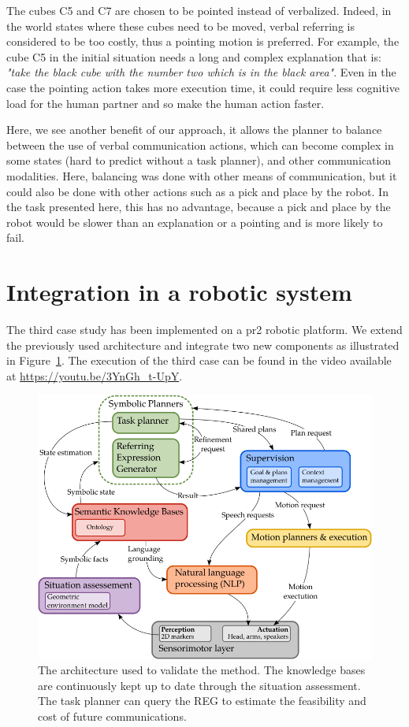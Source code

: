 The cubes C5 and C7 are chosen to be pointed instead of verbalized. Indeed, in the world states where these cubes need to be moved, verbal referring is considered to be too costly, thus a pointing motion is preferred. For example, the cube C5 in the initial situation needs a long and complex explanation that is: \textit{"take the black cube with the number two which is in the black area"}. Even in the case the pointing action takes more execution time, it could require less cognitive load for the human partner and so make the human action faster.

Here, we see another benefit of our approach, it allows the planner to balance between the use of verbal communication actions, which can become complex in some states (hard to predict without a task planner), and other communication modalities. Here, balancing was done with other means of communication, but it could also be done with other actions such as a pick and place by the robot. In the task presented here, this has no advantage, because a pick and place by the robot would be slower than an explanation or a pointing and is more likely to fail.

\section{Integration in a robotic system}

The third case study has been implemented on a pr2 robotic platform. We extend the previously used architecture and integrate two new components as illustrated in Figure~\ref{fig:chap5_archi}. The execution of the third case can be found in the video available at \url{https://youtu.be/3YnGh_t-UpY}.

\begin{figure}[!ht]
\centering
\includegraphics[scale=0.6]{figures/chapter5/architecture.png}
\caption{\label{fig:chap5_archi} The architecture used to validate the method. The knowledge bases are continuously kept up to date through the situation assessment. The task planner can query the REG to estimate the feasibility and cost of future communications. }
\end{figure}

